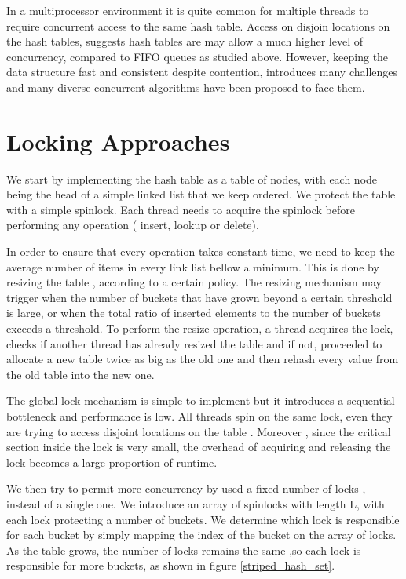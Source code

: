 In a multiprocessor environment it is quite common for multiple threads to require concurrent access to the same hash table. Access on disjoin locations on the hash tables, suggests hash tables are may allow a much higher level of concurrency, compared to FIFO queues as studied above. However, keeping the data structure fast and consistent despite contention, introduces many challenges and many diverse concurrent algorithms have been proposed to face them.
   

\section{ Locking  Approaches}

We start by implementing the hash table as a table of nodes, with each node being the head of a simple linked list that we keep ordered. We protect the table with a simple spinlock. Each thread needs to acquire the spinlock before performing any operation ( insert, lookup or delete). 

In order to ensure that every operation takes constant time, we need to keep the average number of items in every link list bellow a minimum. This is done by resizing the table , according to a certain policy. The resizing mechanism may trigger when the number of buckets that have grown beyond a certain threshold is large, or when the total ratio of inserted elements to the number of buckets exceeds a threshold. To perform the resize operation, a thread acquires the lock, checks if another thread has already resized the table and if not, proceeded to allocate a new table twice as big as the old one and then rehash every value from the old table into the new one.

The global lock mechanism is simple to implement but it introduces a sequential bottleneck and performance is low. All threads spin on the same lock, even they are trying to access disjoint locations on the table . Moreover , since the critical section inside the lock is very small, the overhead of acquiring and releasing the lock becomes a large proportion of runtime.

We then try to permit more concurrency by used a fixed number of locks , instead of a single one. We introduce an array of spinlocks with length L, with each lock protecting a number of buckets. We determine which lock is responsible for each bucket by simply mapping the index of the bucket on the array of locks. As the table grows, the number of locks remains the same ,so each lock is responsible for more buckets, as shown in figure \ref{striped_hash_set}.

